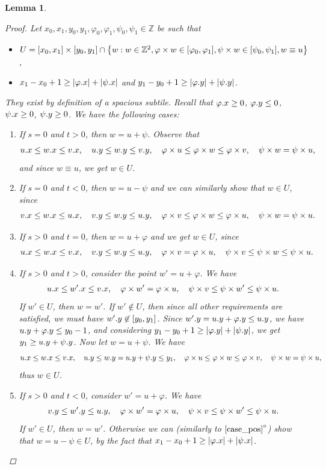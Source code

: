 \documentclass[11pt, letterpaper]{article}
\theoremstyle{plain}
\newtheorem{lemma}{Lemma}
\theoremstyle{definition}
\theoremstyle{remark}
\newcommand{\Z}{\mathbb{Z}}
\renewcommand{\phi}{\varphi}
\newcommand{\set}[1]{\left\lbrace #1 \right\rbrace}
\newcommand{\eq}[1]{\begin{align*} #1 \end{align*}}
\begin{document}
\begin{lemma}
\begin{proof}
		Let $x_0, x_1, y_0, y_1, \phi_0, \phi_1, \psi_0, \psi_1 \in \Z$ be such that
		\begin{itemize}
			\item $ U = [x_0, x_1] \times [y_0, y_1] \cap \set{w : w \in \Z^2, \h{w} \in [\phi_0, \phi_1], \s{w} \in [\psi_0, \psi_1], w \equiv u}$,
			\item $x_1 - x_0 + 1 \ge |\x{\phi}| + |\x{\psi}|$ and $y_1 - y_0 + 1 \ge |\y{\phi}| + |\y{\psi}|$.
		\end{itemize}
		They exist by definition of a spacious subtile.
		Recall that $\x{\phi} \ge 0$, $\y{\phi} \le 0$, $\psi.x \ge 0$, $\psi.y \ge 0$.
		We have the following cases:
		\begin{enumerate}[$1^\circ$]
			\item If $s = 0$ and $t > 0$, then $w = u + \psi$. Observe that
				\eq{
					\x{u} \le \x{w} \le \x{v}, \quad \y{u} \le \y{w} \le \y{v}, \quad \h{u} \le \h{w} \le \h{v}, \quad \s{w} = \s{u},
				}
				and since $w \equiv u$, we get $w \in U$.
			\item If $s = 0$ and $t < 0$, then $w = u - \psi$ and we can similarly show that $w \in U$, since
				\[\x{v} \le \x{w} \le \x{u}, \quad \y{v} \le \y{w} \le \y{u}, \quad \h{v} \le \h{w} \le \h{u}, \quad \s{w} = \s{u}.\]
			\item If $s > 0$ and $t = 0$, then $w = u + \phi$ and we get $w \in U$, since
				\[\x{u} \le \x{w} \le \x{v}, \quad \y{v} \le \y{w} \le \y{u}, \quad \h{v} = \h{u}, \quad \s{v} \le \s{w} \le \s{u}.\]
			\item If $s > 0$ and $t > 0$, consider the point $w' = u + \phi$. \label{case_pos}
				We have \eq{
					\x{u} \le \x{w'} \le \x{v}, \quad \h{w'} = \h{u}, \quad \s{v} \le \s{w'} \le \s{u}.
				}
				If $w' \in U$, then $w = w'$.
				If $w' \not \in U$, then since all other requirements are satisfied, we must have $w'.y \not \in [y_0, y_1]$.
				Since $\y{w'} = \y{u} + \y{\phi} \le \y{u}$, we have $\y{u} + \y{\phi} \le y_0 - 1$, and
				considering $y_1 - y_0 + 1 \ge |\y{\phi}| + |\y{\psi}|$, we get $y_1 \ge u.y + \psi.y$.
				Now let $w = u + \psi$.
				We have \eq{
					\x{u} \le \x{w} \le \x{v}, \quad \y{u} \le \y{w} = \y{u} + \y{\psi} \le y_1, \quad \h{u} \le \h{w} \le \h{v}, \quad \s{w} = \s{u},
				}
				thus $w \in U$.
			\item If $s > 0$ and $t < 0$, consider $w' = u + \phi$.
				We have \eq{
					\y{v} \le \y{w'} \le \y{u}, \quad \h{w'} = \h{u}, \quad \s{v} \le \s{w'} \le \s{u}.
				}
				If $w' \in U$, then $w = w'$.
				Otherwise we can (similarly to $\ref{case_pos}^\circ$) show that $w = u - \psi \in U$, by the fact that $x_1 - x_0 + 1 \ge |\x{\phi}| + |\x{\psi}|$. \qedhere
		\end{enumerate}
	\end{proof}
\end{lemma}
\end{document}
